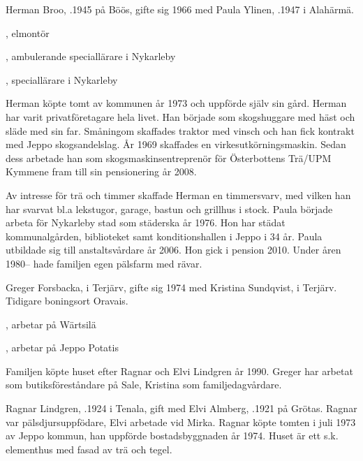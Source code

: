 
Herman Broo, .1945 på Böös, gifte sig 1966 med Paula Ylinen, .1947 i Alahärmä.
\begin{jhchildren}
  \item {}, elmontör
  \item {}, ambulerande speciallärare i Nykarleby
  \item {}, speciallärare i Nykarleby
\end{jhchildren}

Herman  köpte tomt av kommunen år 1973 och uppförde själv sin gård. Herman har varit privatföretagare hela livet. Han började som skogshuggare med häst och släde med sin far. Småningom skaffades traktor med vinsch och han fick kontrakt med Jeppo skogsandelslag. År 1969 skaffades en virkesutkörningsmaskin. Sedan dess arbetade han som skogsmaskinsentreprenör för Österbottens Trä/UPM Kymmene fram till sin pensionering år 2008.

Av intresse för trä och timmer skaffade Herman en timmersvarv, med vilken han har svarvat bl.a lekstugor, garage, bastun och grillhus i stock. Paula började arbeta för Nykarleby stad som städerska år 1976. Hon har städat kommunalgården, biblioteket samt konditionshallen i Jeppo i 34 år. Paula utbildade sig till anstaltsvårdare år 2006. Hon gick i pension 2010. Under åren 1980-- hade familjen egen pälsfarm med rävar.




Greger Forsbacka,  i Terjärv, gifte sig 1974 med Kristina Sundqvist,  i Terjärv. Tidigare boningsort Oravais.
\begin{jhchildren}
  \item {}, arbetar på Wärtsilä
  \item {}, arbetar på Jeppo Potatis
\end{jhchildren}
Familjen köpte huset efter Ragnar och Elvi Lindgren år 1990. Greger har arbetat som butiksföreståndare på Sale, Kristina som familjedagvårdare.

Ragnar Lindgren, .1924 i Tenala, gift med Elvi Almberg, .1921 på Grötas. Ragnar var pälsdjursuppfödare, Elvi arbetade vid Mirka. Ragnar köpte tomten i juli 1973 av Jeppo kommun, han uppförde 				bostadsbyggnaden år 1974. Huset är ett s.k. elementhus med fasad av trä och tegel.

